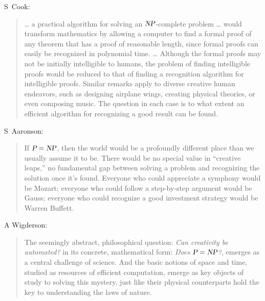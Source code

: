 \documentclass[9pt,t,serif,professionalfont,xcolor={table,dvipsnames},noamsthm]{beamer}
\begin{document}
\begin{frame} %
S~Cook: 

\begin{quote}\small %
\noindent \ldots{} a practical algorithm for solving an $\textsl{NP}$-complete problem
\ldots{}
would transform mathematics by allowing a computer to find a formal
proof of any theorem that has a proof of reasonable length, 
since formal proofs can
easily be recognized in polynomial time. 
\ldots{} 
Although the formal proofs may not be initially intelligible
to humans, the problem of finding intelligible proofs would be reduced to that
of finding a recognition algorithm for intelligible proofs. 
Similar remarks apply
to diverse creative human endeavors, such as designing airplane wings, creating
physical theories, or even composing music. 
The question in each case is to what
extent an efficient algorithm for recognizing a good result can be found.
\end{quote}

S~Aaronson: %

\begin{quote}\small
If $\textsl{P}=\textsl{NP}$, then the world would be a profoundly different place 
than we usually assume it to be. 
There would be no special value in ``creative leaps,'' no fundamental 
gap between solving a problem and recognizing the solution once it's found. 
Everyone who could appreciate a symphony would be Mozart; everyone 
who could follow a step-by-step argument would be Gauss; everyone who 
could recognize a good investment strategy would be Warren Buffett.
\end{quote}

A Wigderson: %

\begin{quote}\small
The seemingly abstract, philosophical question: 
\textit{Can creativity be automated?} in its concrete, mathematical 
form: \textit{Does $\textsl{P} = \textsl{NP}$?},
emerges as a central challenge of science. And the basic notions of
space and time, studied as resources of efficient computation, emerge
as key objects of study to solving this mystery, just like their physical
counterparts hold the key to understanding the laws of nature.
\end{quote}
\end{frame}
\end{document}
